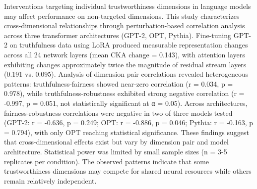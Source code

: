 
Interventions targeting individual trustworthiness dimensions in language models may affect performance on non-targeted dimensions. This study characterizes cross-dimensional relationships through perturbation-based correlation analysis across three transformer architectures (GPT-2, OPT, Pythia). Fine-tuning GPT-2 on truthfulness data using LoRA produced measurable representation changes across all 24 network layers (mean CKA change = 0.143), with attention layers exhibiting changes approximately twice the magnitude of residual stream layers (0.191 vs. 0.095). Analysis of dimension pair correlations revealed heterogeneous patterns: truthfulness-fairness showed near-zero correlation (r = 0.034, p = 0.978), while truthfulness-robustness exhibited strong negative correlation (r = -0.997, p = 0.051, not statistically significant at α = 0.05). Across architectures, fairness-robustness correlations were negative in two of three models tested (GPT-2: r = -0.636, p = 0.249; OPT: r = -0.886, p = 0.046; Pythia: r = -0.163, p = 0.794), with only OPT reaching statistical significance. These findings suggest that cross-dimensional effects exist but vary by dimension pair and model architecture. Statistical power was limited by small sample sizes (n = 3-5 replicates per condition). The observed patterns indicate that some trustworthiness dimensions may compete for shared neural resources while others remain relatively independent.
